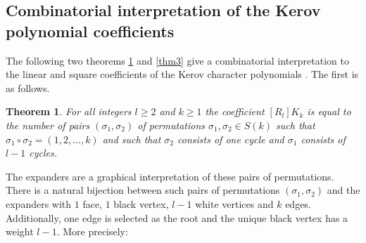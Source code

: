 \documentclass[submission]{FPSAC2021}
\newtheorem{theorem}{Theorem}
\begin{document}
\subsection{Combinatorial interpretation of 
the Kerov polynomial coefficients}
The following two theorems 
\cref{thm1} and \cref{thm3}
give a combinatorial interpretation to 
the linear and square coefficients of 
the Kerov character polynomials 
\cite[Theorem 1.2, Theorem 1.3]{DFS10}.
The first is as follows.
\begin{theorem}
\label{thm1} 
For all integers $l\geq2$ and $k\geq 1$ 
the coefficient $[R_l] K_k$ 
is equal to the number of pairs 
$(\sigma_1,\sigma_2)$ of permutations 
$\sigma_1, \sigma_2 \in S(k)$ such that
$\sigma_1\circ\sigma_2=(1,2,\ldots,k)$ and 
such that $\sigma_2$ consists of one
cycle and $\sigma_1$ consists of $l-1$ cycles.
\end{theorem}
The expanders are a graphical interpretation 
of these pairs of permutations.
There is a natural bijection between such 
pairs of permutations $(\sigma_1,
\sigma_2)$ and the expanders with $1$ face, 
$1$ black vertex, $l-1$ white
vertices and $k$ edges. Additionally, one edge 
is selected as the root and the unique black 
vertex has a weight $l-1$. More precisely:
\end{document}
